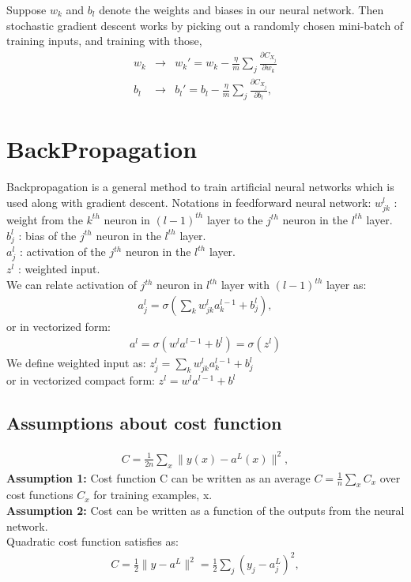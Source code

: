 Suppose $w_k$ and $b_l$ denote the weights and biases in our neural network. Then stochastic gradient descent works by picking out a randomly chosen mini-batch of training inputs, and training with those,
\begin{eqnarray} 
w_k & \rightarrow & w_k' = w_k-\frac{\eta}{m}
\sum_j \frac{\partial C_{X_j}}{\partial w_k}\\
b_l & \rightarrow & b_l' = b_l-\frac{\eta}{m}
\sum_j \frac{\partial C_{X_j}}{\partial b_l},
\end{eqnarray}

\section{BackPropagation}
Backpropagation is a general method to train artificial neural networks which is used along with gradient descent.
Notations in feedforward neural network:
$w^l_{jk}$ :  weight from the $k^{th}$ neuron in $(l-1)^{th}$ layer to the $j^{th}$ neuron in the $l^{th}$ layer.\\
$b^l_j$ : bias of the $j^{th}$ neuron in the $l^{th}$ layer.\\
$a^l_j$ : activation of the $j^{th}$ neuron in the $l^{th}$ layer.\\
$z^l$ : weighted input.\\

We can relate activation of $j^{th}$ neuron in $l^{th}$ layer with $(l-1)^{th}$ layer as:
\begin{eqnarray} 
a^{l}_j = \sigma\left( \sum_k w^{l}_{jk} a^{l-1}_k + b^l_j \right),
\end{eqnarray}
or in vectorized form:
\begin{eqnarray} 
a^{l} = \sigma(w^l a^{l-1}+b^l) = \sigma(z^l)
\end{eqnarray}
We define weighted input as:
$z^l_j = \sum_k w^l_{jk} a^{l-1}_k+b^l_j$ \\
or in vectorized compact form: 
$z^l = w^l a^{l-1}+b^l$\\

\subsection{Assumptions about cost function}

\begin{eqnarray}
C = \frac{1}{2n} \sum_x \|y(x)-a^L(x)\|^2,
\end{eqnarray}
\textbf{Assumption 1:} Cost function C can be written as an average $C = \frac{1}{n} \sum_x C_x$ over cost functions $C_x$ for training examples, x.\\
\textbf{Assumption 2:} Cost can be written as a function of the outputs from the neural network.\\
Quadratic cost function satisfies as:
\begin{eqnarray}
C = \frac{1}{2} \|y-a^L\|^2 = \frac{1}{2} \sum_j (y_j-a^L_j)^2,
\end{eqnarray}

